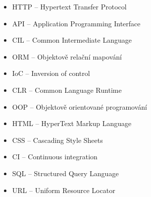 \documentclass[12pt,a4paper]{report}
\begin{document}



\tableofcontents









\listoffigures


\begin{itemize}
	\item HTTP -- Hypertext Transfer Protocol
	\item API -- Application Programming Interface
	\item CIL -- Common Intermediate Language
	\item ORM -- Objektově relační mapování
	\item IoC -- Inversion of control
	\item CLR -- Common Language Runtime
	\item OOP -- Objektově orientované programování
	\item HTML -- HyperText Markup Language 
	\item CSS -- Cascading Style Sheets
	\item CI -- Continuous integration
	\item SQL -- Structured Query Language
	\item URL -- Uniform Resource Locator
	
\end{itemize}

\appendix
\end{document}
